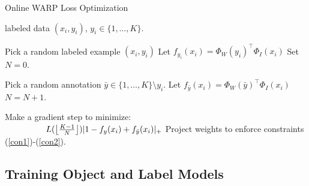\begin{algorithm}[tb]
   \caption{Online WARP Loss Optimization}
   \label{alg:train}
\begin{algorithmic}
    labeled data $(x_i,y_i)$, $y_i \in \{1,\dots,K\}$. 

   \REPEAT
   \STATE Pick a random labeled example $(x_i,y_i)$
   \STATE Let $f_{y_i}(x_i) =  \Phi_{W}(y_i)^\top \Phi_{I}(x_i)$
   \STATE Set $N = 0$.

   \REPEAT
   \STATE Pick a random annotation $\bar{y} \in \{1,\dots,K\} \setminus y_i$.
   \STATE Let $f_{\bar{y}}(x_i) =  \Phi_{W}(\bar{y})^\top \Phi_{I}(x_i)$
   \STATE $N=N+1$.

   \STATE Make a gradient step to minimize:\\  %
~~~~~~~~~ $L(\left \lfloor \frac{K-1}{N} \right \rfloor) |1-f_y(x_i)+f_{\bar{y}}(x_i)|_{+} $
   \STATE Project weights to enforce constraints (\ref{con1})-(\ref{con2}).
   \ENDIF 


\end{algorithmic}
\end{algorithm}
\fi

\subsection{Training Object and Label Models}
\label{olmodel}

